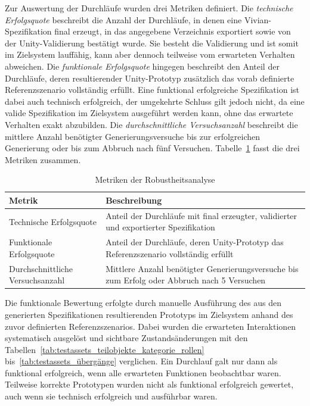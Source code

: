 Zur Auswertung der Durchläufe wurden drei Metriken definiert. Die \textit{technische Erfolgsquote} beschreibt die Anzahl der Durchläufe, in denen eine Vivian-Spezifikation final erzeugt, in das angegebene Verzeichnis exportiert sowie von der Unity-Validierung bestätigt wurde. Sie besteht die Validierung und ist somit im Zielsystem lauffähig, kann aber dennoch teilweise vom erwarteten Verhalten abweichen. Die \textit{funktionale Erfolgsquote} hingegen beschreibt den Anteil der Durchläufe, deren resultierender Unity-Prototyp zusätzlich das vorab definierte Referenzszenario vollständig erfüllt. Eine funktional erfolgreiche Spezifikation ist dabei auch technisch erfolgreich, der umgekehrte Schluss gilt jedoch nicht, da eine valide Spezifikation im Zielsystem ausgeführt werden kann, ohne das erwartete Verhalten exakt abzubilden. Die \textit{durchschnittliche Versuchsanzahl} beschreibt die mittlere Anzahl benötigter Generierungsversuche bis zur erfolgreichen Generierung oder bis zum Abbruch nach fünf Versuchen. Tabelle~\ref{tab:robustheitsanalyse_kriterien} fasst die drei Metriken zusammen.


\begin{table}[htbp]
  \centering
  \begin{tabularx}{\linewidth}{l>{\raggedright\arraybackslash}X}
    \toprule
    Metrik                           & Beschreibung                                                                                 \\
    \midrule
    Technische Erfolgsquote          & Anteil der Durchläufe mit final erzeugter, validierter und exportierter Spezifikation        \\
    Funktionale Erfolgsquote         & Anteil der Durchläufe, deren Unity-Prototyp das Referenzszenario vollständig erfüllt         \\
    Durchschnittliche Versuchsanzahl & Mittlere Anzahl benötigter Generierungsversuche bis zum Erfolg oder Abbruch nach 5 Versuchen \\
    \bottomrule
  \end{tabularx}
  \caption{Metriken der Robustheitsanalyse}\label{tab:robustheitsanalyse_kriterien}
\end{table}

Die funktionale Bewertung erfolgte durch manuelle Ausführung des aus den generierten Spezifikationen resultierenden Prototyps im Zielsystem anhand des zuvor definierten Referenzszenarios. Dabei wurden die erwarteten Interaktionen systematisch ausgelöst und sichtbare Zustandsänderungen mit den Tabellen~\ref{tab:testassets_teilobjekte_kategorie_rollen} bis~\ref{tab:testassets_übergänge} verglichen. Ein Durchlauf galt nur dann als funktional erfolgreich, wenn alle erwarteten Funktionen beobachtbar waren. Teilweise korrekte Prototypen wurden nicht als funktional erfolgreich gewertet, auch wenn sie technisch erfolgreich und ausführbar waren.

